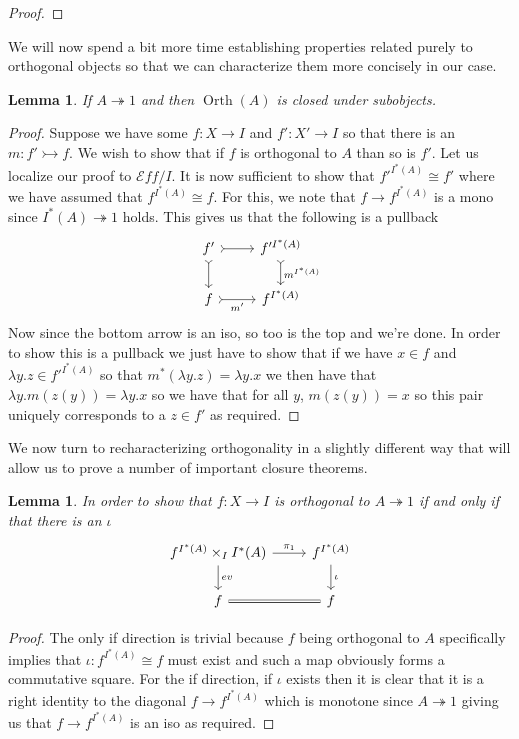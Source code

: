\documentclass[12pt]{amsart}
\newcommand{\todo}[1]{{\color{red}{\LARGE #1}}}
\newcommand{\eff}{\mathcal{E}\!f\!f}
\newcommand{\epi}{\ensuremath{\twoheadrightarrow}}
\newcommand{\mono}{\ensuremath{\rightarrowtail}}
\DeclareMathOperator{\orth}{Orth}
\newtheorem{lem}[thm]{Lemma}
\begin{document}
\begin{proof}
  \todo{Essentially this means showing that products and equalizers
    preserve orthogonality, $\Pi$ restricts, and pullbacks preserve
    orthogonality}
\end{proof}
We will now spend a bit more time establishing properties related
purely to orthogonal objects so that we can characterize them more
concisely in our case.
\begin{lem}\label{lem:orth:orthsubobjects}
  If $A \epi 1$ and then $\orth(A)$ is closed under subobjects.
\end{lem}
\begin{proof}
  Suppose we have some $f : X \to I$ and $f' : X' \to I$ so that there
  is an $m : f' \mono f$. We wish to show that if $f$ is orthogonal to
  $A$ than so is $f'$. Let us localize our proof to $\eff/I$. It is
  now sufficient to show that $f'^{I^*(A)} \cong f'$ where we have
  assumed that $f^{I^*(A)} \cong f$. For this, we note that
  $f \to f^{I^*(A)}$ is a mono since $I^*(A) \epi 1$ holds. This gives
  us that the following is a pullback
  \[
    \begin{tikzcd}
      f' \ar[d, rightarrowtail] \ar[r, rightarrowtail] & {f'^{I^*(A)}} \ar[d, rightarrowtail, "m^{I^*(A)}"]\\
      f \ar[r, rightarrowtail, swap, "m'"] & {f^{I^*(A)}}
    \end{tikzcd}
  \]
  Now since the bottom arrow is an iso, so too is the top and we're
  done. In order to show this is a pullback we just have to show that
  if we have $x \in f$ and $\lambda y. z \in f'^{I^*(A)}$ so that
  $m^*(\lambda y. z) = \lambda y. x$ we then have that
  $\lambda y. m(z(y)) = \lambda y. x$ so we have that for all $y$,
  $m(z(y)) = x$ so this pair uniquely corresponds to a $z \in f'$ as
  required.
\end{proof}
We now turn to recharacterizing orthogonality in a slightly different
way that will allow us to prove a number of important closure
theorems.
\begin{lem}\label{lem:orth:orthpushout}
  In order to show that $f : X \to I$ is orthogonal to $A \epi 1$ if
  and only if that there is an $\iota$
  \[
    \begin{tikzcd}
      f^{I^*(A)} \times_I I^*(A) \ar[r, "\pi_1"] \ar[d, "ev"] & f^{I^*(A)} \ar[d, "\iota"]\\
      f \ar[r, equals] & f
    \end{tikzcd}
  \]
\end{lem}
\begin{proof}
  The only if direction is trivial because $f$ being orthogonal to $A$
  specifically implies that $\iota : f^{I^*(A)} \cong f$ must exist
  and such a map obviously forms a commutative square. For the if
  direction, if $\iota$ exists then it is clear that it is a right
  identity to the diagonal $f \to f^{I^*(A)}$ which is monotone since
  $A \epi 1$ giving us that $f \to f^{I^*(A)}$ is an iso as required.
\end{proof}
\end{document}
